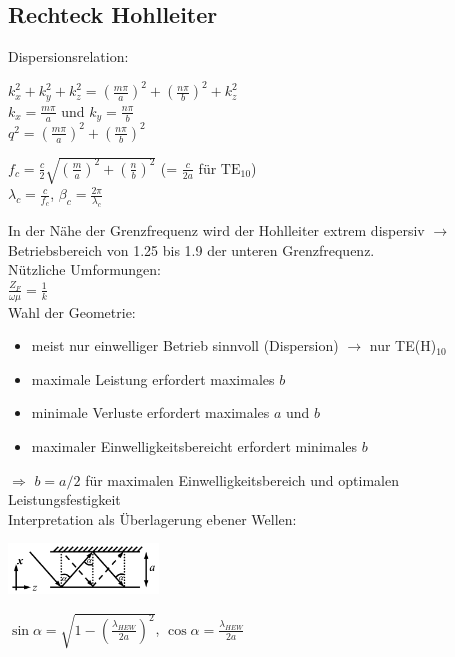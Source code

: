 \documentclass[english]{latex4ei/latex4ei_sheet}
\begin{document}
\begin{sectionbox}
	\subsection{Rechteck Hohlleiter}
	Dispersionsrelation:
	\begin{emphbox}
		$k_x^2 + k_y^2 + k_z^2 = (\frac{m\pi}{a})^2+(\frac{n\pi}{b})^2 + k_z^2$\\
		$k_x = \frac{m\pi}{a}$ und $k_y = \frac{n\pi}{b}$\\
		$q^2 = (\frac{m\pi}{a})^2+(\frac{n\pi}{b})^2$
	\end{emphbox}
	
	\begin{emphbox}
		$f_c = \frac{c}{2}\sqrt{\left(\frac{m}{a}\right)^2+\left(\frac{n}{b}\right)^2}$ (= $\frac{c}{2a}$ für $\text{TE}_{10}$)\\
		$\lambda_c = \frac{c}{f_c}$, $\beta_c = \frac{2\pi}{\lambda_c}$\\
	\end{emphbox}

	In der Nähe der Grenzfrequenz wird der Hohlleiter extrem dispersiv $\rightarrow$ Betriebsbereich von 1.25 bis 1.9 der unteren Grenzfrequenz.\\

	Nützliche Umformungen:\\
	$\frac{Z_F}{\omega\mu} = \frac{1}{k}$\\
	
	Wahl der Geometrie:
	\begin{itemize}
		\item meist nur einwelliger Betrieb sinnvoll (Dispersion) $\rightarrow$ nur TE(H)$_{10}$
		\item maximale Leistung erfordert maximales $b$
		\item minimale Verluste erfordert maximales $a$ und $b$
		\item maximaler Einwelligkeitsbereicht erfordert minimales $b$
	\end{itemize}
	$\Rightarrow$ $b = a / 2$ für maximalen Einwelligkeitsbereich und optimalen Leistungsfestigkeit\\

	Interpretation als Überlagerung ebener Wellen:\\
	\begin{center}\includegraphics[width = 4cm]{./img/hohlleiter-reflexion.png}\end{center}
	$\sin \alpha=\sqrt{1-\left(\frac{\lambda_{H E W}}{2 a}\right)^{2}}$, $\cos \alpha=\frac{\lambda_{H E W}}{2 a}$\\
\end{sectionbox}
\end{document}

